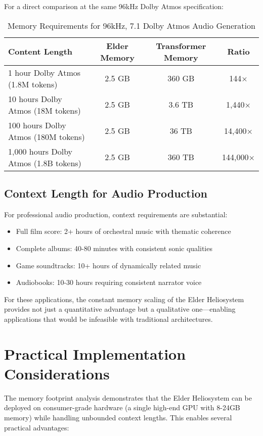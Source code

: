 For a direct comparison at the same 96kHz Dolby Atmos specification:

\begin{table}[h]
\centering
\begin{tabular}{|l|c|c|c|}
\hline
\textbf{Content Length} & \textbf{Elder Memory} & \textbf{Transformer Memory} & \textbf{Ratio} \\
\hline
1 hour Dolby Atmos (1.8M tokens) & 2.5 GB & 360 GB & 144× \\
10 hours Dolby Atmos (18M tokens) & 2.5 GB & 3.6 TB & 1,440× \\
100 hours Dolby Atmos (180M tokens) & 2.5 GB & 36 TB & 14,400× \\
1,000 hours Dolby Atmos (1.8B tokens) & 2.5 GB & 360 TB & 144,000× \\
\hline
\end{tabular}
\caption{Memory Requirements for 96kHz, 7.1 Dolby Atmos Audio Generation}
\end{table}

\subsection{Context Length for Audio Production}

For professional audio production, context requirements are substantial:
\begin{itemize}
    \item Full film score: 2+ hours of orchestral music with thematic coherence
    \item Complete albums: 40-80 minutes with consistent sonic qualities
    \item Game soundtracks: 10+ hours of dynamically related music
    \item Audiobooks: 10-30 hours requiring consistent narrator voice
\end{itemize}

For these applications, the constant memory scaling of the Elder Heliosystem provides not just a quantitative advantage but a qualitative one—enabling applications that would be infeasible with traditional architectures.

\section{Practical Implementation Considerations}

The memory footprint analysis demonstrates that the Elder Heliosystem can be deployed on consumer-grade hardware (a single high-end GPU with 8-24GB memory) while handling unbounded context lengths. This enables several practical advantages:

